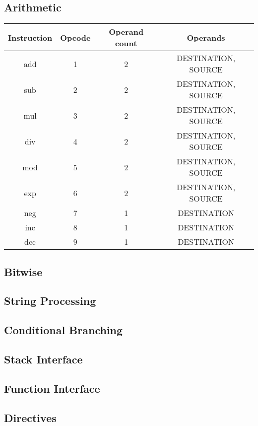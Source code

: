 \documentclass[manuscript,screen,nonacm]{acmart}
\begin{document}
\subsection{Arithmetic}
\begin{center}
\begin{tabular}{|c|c|c|c|}
    \hline
    Instruction & Opcode & Operand count & Operands \\
    \hline
    add & 1 & 2 & DESTINATION, SOURCE \\
    sub & 2 & 2 & DESTINATION, SOURCE \\
    mul & 3 & 2 & DESTINATION, SOURCE \\
    div & 4 & 2 & DESTINATION, SOURCE \\
    mod & 5 & 2 & DESTINATION, SOURCE \\
    exp & 6 & 2 & DESTINATION, SOURCE \\
    neg & 7 & 1 & DESTINATION \\
    inc & 8 & 1 & DESTINATION \\
    dec & 9 & 1 & DESTINATION \\
    \hline
\end{tabular}
\end{center}

\subsection{Bitwise}
\subsection{String Processing}
\subsection{Conditional Branching}
\subsection{Stack Interface}
\subsection{Function Interface}
\subsection{Directives}
\end{document}
